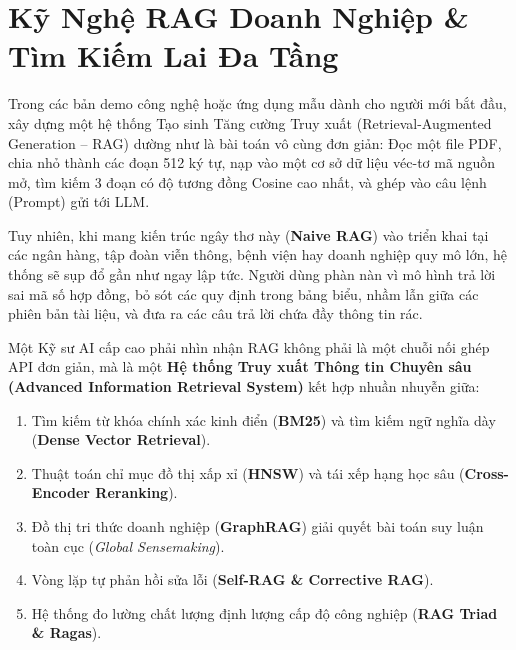 
\chapter{Kỹ Nghệ RAG Doanh Nghiệp \& Tìm Kiếm Lai Đa Tầng}
\label{ch:enterprise-rag}

Trong các bản demo công nghệ hoặc ứng dụng mẫu dành cho người mới bắt đầu, xây dựng một hệ thống Tạo sinh Tăng cường Truy xuất (Retrieval-Augmented Generation -- RAG) dường như là bài toán vô cùng đơn giản: Đọc một file PDF, chia nhỏ thành các đoạn 512 ký tự, nạp vào một cơ sở dữ liệu véc-tơ mã nguồn mở, tìm kiếm 3 đoạn có độ tương đồng Cosine cao nhất, và ghép vào câu lệnh (Prompt) gửi tới LLM.

Tuy nhiên, khi mang kiến trúc ngây thơ này (\textbf{Naive RAG}) vào triển khai tại các ngân hàng, tập đoàn viễn thông, bệnh viện hay doanh nghiệp quy mô lớn, hệ thống sẽ sụp đổ gần như ngay lập tức. Người dùng phàn nàn vì mô hình trả lời sai mã số hợp đồng, bỏ sót các quy định trong bảng biểu, nhầm lẫn giữa các phiên bản tài liệu, và đưa ra các câu trả lời chứa đầy thông tin rác.

Một Kỹ sư AI cấp cao phải nhìn nhận RAG không phải là một chuỗi nối ghép API đơn giản, mà là một \textbf{Hệ thống Truy xuất Thông tin Chuyên sâu (Advanced Information Retrieval System)} kết hợp nhuần nhuyễn giữa:
\begin{enumerate}
  \item Tìm kiếm từ khóa chính xác kinh điển (\textbf{BM25}) và tìm kiếm ngữ nghĩa dày (\textbf{Dense Vector Retrieval}).
  \item Thuật toán chỉ mục đồ thị xấp xỉ (\textbf{HNSW}) và tái xếp hạng học sâu (\textbf{Cross-Encoder Reranking}).
  \item Đồ thị tri thức doanh nghiệp (\textbf{GraphRAG}) giải quyết bài toán suy luận toàn cục (\textit{Global Sensemaking}).
  \item Vòng lặp tự phản hồi sửa lỗi (\textbf{Self-RAG \& Corrective RAG}).
  \item Hệ thống đo lường chất lượng định lượng cấp độ công nghiệp (\textbf{RAG Triad \& Ragas}).
\end{enumerate}

